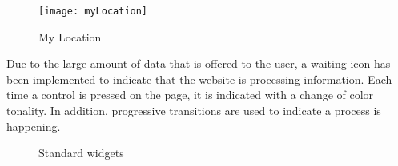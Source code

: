 

\begin{figure}[ht]
    \centering
    \texttt{[image: myLocation]}
    \caption{My Location}
\end{figure}



Due to the large amount of data that is offered to the user, a waiting icon has been implemented to indicate that the website is processing information.
Each time a control is pressed on the page, it is indicated with a change of color tonality.
In addition, progressive transitions are used to indicate a process is happening.\\

\begin{figure}[ht]
    \centering
    \hfill
    \vfill
    \hfill
    \caption{Standard widgets}
\end{figure}